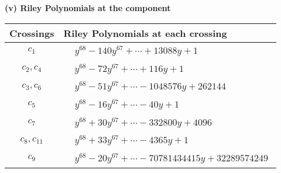 \documentclass[1p]{elsarticle_modified}
\theoremstyle{definition}
\begin{document}
\newpage\renewcommand{\arraystretch}{1}
\flushleft \textbf{(v) Riley Polynomials at the component}\newline \\
\begin{tabular}{m{50pt}|m{274pt}}
Crossings & \hspace{64pt}Riley Polynomials at each crossing \\
\hline $$\begin{aligned}c_{1}\end{aligned}$$&$\begin{aligned}
&y^{68}-140 y^{67}+\cdots+13088 y+1
\end{aligned}$\\
\hline $$\begin{aligned}c_{2},c_{4}\end{aligned}$$&$\begin{aligned}
&y^{68}-72 y^{67}+\cdots+116 y+1
\end{aligned}$\\
\hline $$\begin{aligned}c_{3},c_{6}\end{aligned}$$&$\begin{aligned}
&y^{68}-51 y^{67}+\cdots-1048576 y+262144
\end{aligned}$\\
\hline $$\begin{aligned}c_{5}\end{aligned}$$&$\begin{aligned}
&y^{68}-16 y^{67}+\cdots-40 y+1
\end{aligned}$\\
\hline $$\begin{aligned}c_{7}\end{aligned}$$&$\begin{aligned}
&y^{68}+30 y^{67}+\cdots-332800 y+4096
\end{aligned}$\\
\hline $$\begin{aligned}c_{8},c_{11}\end{aligned}$$&$\begin{aligned}
&y^{68}+33 y^{67}+\cdots-4365 y+1
\end{aligned}$\\
\hline $$\begin{aligned}c_{9}\end{aligned}$$&$\begin{aligned}
&y^{68}-20 y^{67}+\cdots-70781434415 y+32289574249
\end{aligned}$\\

\end{tabular}
\end{document}
